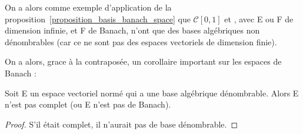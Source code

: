 On a alors comme exemple d'application de la
proposition~\ref{proposition_basis_banach_space} que $\mathcal{C}[0, 1]$ et
, avec E ou F de dimension infinie, et F de Banach,
n'ont que des bases algébriques non dénombrables (car ce ne sont pas des espaces
vectoriels de dimension finie).

On a alors, grace à la contraposée, un corollaire important sur les espaces de
Banach :

\begin{corollary}
	Soit E un espace vectoriel normé qui a une base algébrique dénombrable.
	Alors E n'est pas complet (ou E n'est pas de Banach).
\end{corollary}

\begin{proof}
	S'il était complet, il n'aurait pas de base dénombrable.
\end{proof}
